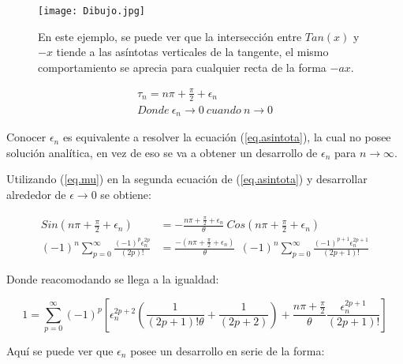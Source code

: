 \begin{figure}
    \centering
    \texttt{[image: Dibujo.jpg]}
    \caption{En este ejemplo, se puede ver que la intersección entre $Tan(x)$ y $-x$ tiende a las asíntotas verticales de la tangente, el mismo comportamiento se aprecia para cualquier recta de la forma $- a x$.}
    \label{fig:Dibujo1}
\end{figure}

\begin{equation}
\begin{array}{c}
    \tau _n = n \pi + \frac{\pi}{2} + \epsilon _n \\[5pt]
    Donde \ \epsilon _n \rightarrow{0}  \ cuando \ n \rightarrow{0}
\end{array}
\label{eq.mu}
\end{equation}


Conocer $\epsilon _n $ es equivalente a resolver la ecuación (\ref{eq.asintota}), la cual no posee solución analítica, en vez de eso se va a obtener un desarrollo de $\epsilon _n $ para $n \rightarrow \infty$.

Utilizando (\ref{eq.mu}) en la segunda ecuación de (\ref{eq.asintota}) y desarrollar alrededor de $\epsilon \rightarrow{0}$ se obtiene:

\begin{equation}
\begin{aligned}
    Sin( n \pi + \frac{\pi}{2} + \epsilon _n ) &= 
    - \frac{n \pi + \frac{\pi}{2} + \epsilon _n}{\theta}  \ Cos( n \pi + \frac{\pi}{2} + \epsilon _n )  \\
         (-1) ^n \sum _{p=0} ^{\infty} \frac{(-1) ^p  \epsilon _n ^{2 p }}{(2p)!} 
    &=  \frac{-(n \pi + \frac{\pi}{2} + \epsilon _n) }{\theta}  \  \	
    (-1) ^n
     \sum _{p=0} ^{\infty} \frac{(-1) ^ {p+1} \epsilon _n ^{2 p + 1}}{(2p+1)!} 
\end{aligned}
\end{equation}


Donde reacomodando se llega a la igualdad:

\begin{equation}
    1 = 
    \sum _{p=0} ^{\infty} (-1) ^p     \left[
   	\epsilon _n ^{2p+2 }\left( \frac{1}{(2p+1)! \theta } + \frac{1}{(2p+2)} \right) +
  	\frac{n \pi + \frac{\pi}{2}}{\theta} \frac{  \epsilon _n ^{2p+1}}{(2p+1)!} 			\right]
\label{igualdad epsilon}
\end{equation}

Aquí se puede ver que  $\epsilon _n $ posee un desarrollo en serie de la forma:

